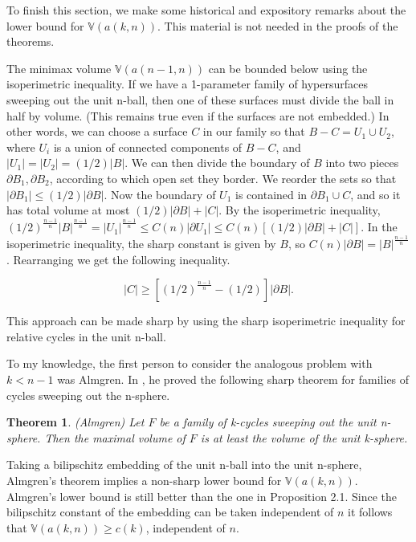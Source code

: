 \documentclass{amsart}
\newtheorem*{reftheorem}{Theorem}
\newtheorem*{Theorem 1}{Theorem 1}
\newtheorem*{Theorem 2}{Theorem 2}
\newtheorem*{Theorem 1A}{Theorem 1A}
\newtheorem*{Theorem 2A}{Theorem 2A}
\newtheorem*{vanishing lemma}{Vanishing Lemma}
\numberwithin{equation}{section}
\begin{document}
To finish this section, we make some historical and expository
remarks about the lower bound for $\mathbb{V}(a(k,n))$.  This
material is not needed in the proofs of the theorems.

The minimax volume $\mathbb{V}(a(n-1,n))$ can be bounded below using
the isoperimetric inequality.  If we have a 1-parameter family of
hypersurfaces sweeping out the unit n-ball, then one of these surfaces
must divide the ball in half by volume.  (This remains true even
if the surfaces are not embedded.)  In other words, we can choose
a surface $C$ in our family so that $B - C = U_1 \cup U_2$, where
$U_i$ is a union of connected components of $B - C$, and $|U_1| =
|U_2| = (1/2) |B|$.  We can then divide the boundary of $B$ into
two pieces $\partial B_1, \partial B_2$, according to which open
set they border.  We reorder the sets so that $|\partial B_1| \le
(1/2) |\partial B|$.  Now the boundary of $U_1$ is contained in
$\partial B_1 \cup C$, and so it has total volume at most $(1/2)
|\partial B| + |C|$.  By the isoperimetric inequality,
$(1/2)^{\frac{n-1}{n}} |B|^{\frac{n-1}{n}} = |U_1|^{\frac{n-1}{n}}
\le C(n) |\partial U_1| \le C(n) [(1/2) |\partial B| + |C|]$.  In
the isoperimetric inequality, the sharp constant is given by $B$,
so $C(n) |\partial B| = |B|^{\frac{n-1}{n}}$.  Rearranging we get
the following inequality.

$$|C| \ge [(1/2)^{\frac{n-1}{n}} - (1/2)] |\partial B|.$$

\noindent This approach can be made sharp by using the
sharp isoperimetric inequality for relative cycles in the
unit n-ball.

To my knowledge, the first person to consider the analogous
problem with $k < n-1$ was Almgren.  In \cite{A2}, he proved the
following sharp theorem for families of cycles sweeping out the
n-sphere.

\begin{reftheorem} (Almgren) Let $F$ be a family of k-cycles
sweeping out the unit n-sphere.  Then the maximal volume of $F$
is at least the volume of the unit k-sphere.
\end{reftheorem}

Taking a bilipschitz embedding of the unit n-ball into the unit
n-sphere, Almgren's theorem implies a non-sharp lower bound
for $\mathbb{V}(a(k,n))$.  Almgren's lower bound is still
better than the one in Proposition 2.1.  Since the bilipschitz
constant of the embedding can be taken independent of $n$ it
follows that $\mathbb{V}(a(k,n)) \ge c(k)$, independent of $n$.
\end{document}
